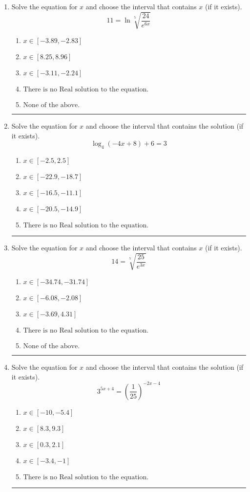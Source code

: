 \documentclass[14pt]{extbook}
\newcommand{\litem}[1]{\item#1\hspace*{-1cm}\rule{\textwidth}{0.4pt}}
\begin{document}
\begin{enumerate}
{\begin{enumerate}[label=\Alph*.]
\end{enumerate} }
\litem{
 Solve the equation for $x$ and choose the interval that contains $x$ (if it exists).\[  11 = \ln{\sqrt[5]{\frac{24}{e^{6x}}}} \]\begin{enumerate}[label=\Alph*.]
\item \( x \in [-3.89, -2.83] \)
\item \( x \in [8.25, 8.96] \)
\item \( x \in [-3.11, -2.24] \)
\item \( \text{There is no Real solution to the equation.} \)
\item \( \text{None of the above.} \)

\end{enumerate} }
\litem{
Solve the equation for $x$ and choose the interval that contains the solution (if it exists).\[ \log_{4}{(-4x+8)}+6 = 3 \]\begin{enumerate}[label=\Alph*.]
\item \( x \in [-2.5, 2.5] \)
\item \( x \in [-22.9, -18.7] \)
\item \( x \in [-16.5, -11.1] \)
\item \( x \in [-20.5, -14.9] \)
\item \( \text{There is no Real solution to the equation.} \)

\end{enumerate} }
\litem{
 Solve the equation for $x$ and choose the interval that contains $x$ (if it exists).\[  14 = \sqrt[7]{\frac{25}{e^{3x}}} \]\begin{enumerate}[label=\Alph*.]
\item \( x \in [-34.74, -31.74] \)
\item \( x \in [-6.08, -2.08] \)
\item \( x \in [-3.69, 4.31] \)
\item \( \text{There is no Real solution to the equation.} \)
\item \( \text{None of the above.} \)

\end{enumerate} }
\litem{
Solve the equation for $x$ and choose the interval that contains the solution (if it exists).\[ 3^{5x+4} = \left(\frac{1}{25}\right)^{-2x-4} \]\begin{enumerate}[label=\Alph*.]
\item \( x \in [-10, -5.4] \)
\item \( x \in [8.3, 9.3] \)
\item \( x \in [0.3, 2.1] \)
\item \( x \in [-3.4, -1] \)
\item \( \text{There is no Real solution to the equation.} \)


\end{enumerate}}
\end{enumerate}
\end{document}
